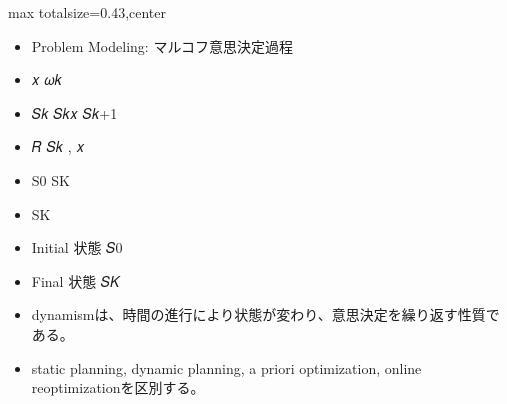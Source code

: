 \clearpage
{}
\begin{minipage}[t]{0.405\textwidth}
\begin{adjustbox}{max totalsize={\textwidth}{0.43\textheight},center}
\begin{minipage}{\textwidth}\scriptsize
{}\begin{itemize}
\item Problem Modeling: マルコフ意思決定過程
\item 𝑥 𝜔𝑘
\item 𝑆𝑘 𝑆𝑘𝑥 𝑆𝑘+1
\item 𝑅 𝑆𝑘 , 𝑥
\item S0 SK
\item SK
\item Initial 状態 𝑆0
\item Final 状態 𝑆𝐾
\end{itemize}\begin{itemize}
\item dynamismは、時間の進行により状態が変わり、意思決定を繰り返す性質である。
\item static planning, dynamic planning, a priori optimization, online reoptimizationを区別する。
\end{itemize}
\end{minipage}
\end{adjustbox}
\end{minipage}\hfill
